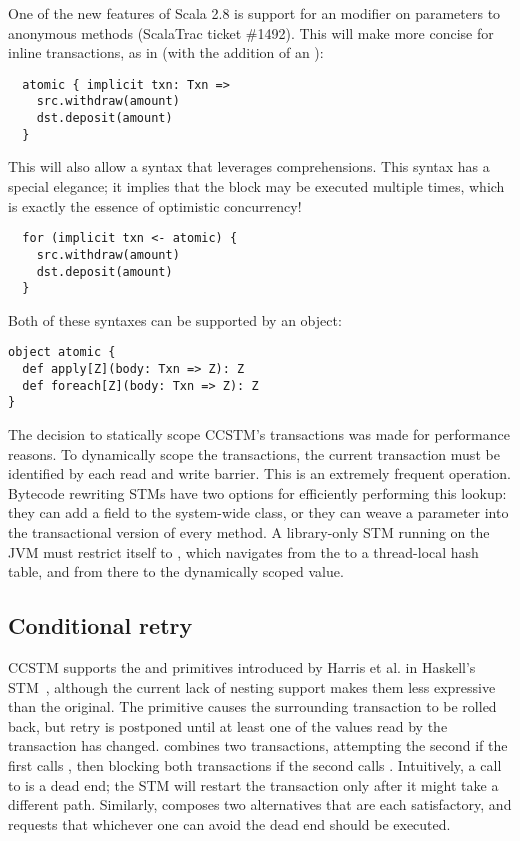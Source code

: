 One of the new features of Scala 2.8 is support for an 
modifier on parameters to anonymous methods (ScalaTrac ticket \#1492).
This will make  more concise for inline
transactions, as in (with the addition of an ):
\lstset{numbers=none}
\begin{lstlisting}
  atomic { implicit txn: Txn =>
    src.withdraw(amount)
    dst.deposit(amount)
  }
\end{lstlisting}
\lstset{numbers=left}
This will also allow a syntax that leverages  comprehensions.
This syntax has a special elegance; it implies that the block may be
executed multiple times, which is exactly the essence of optimistic
concurrency!
\lstset{numbers=none}
\begin{lstlisting}
  for (implicit txn <- atomic) {
    src.withdraw(amount)
    dst.deposit(amount)
  }
\end{lstlisting}
\lstset{numbers=left}
Both of these syntaxes can be supported by an  object:
\lstset{numbers=none}
\begin{lstlisting}
object atomic {
  def apply[Z](body: Txn => Z): Z
  def foreach[Z](body: Txn => Z): Z
}
\end{lstlisting}
\lstset{numbers=left}

The decision to statically scope CCSTM's transactions was made for
performance reasons.  To dynamically scope the transactions, the
current transaction must be identified by each read and write barrier.
This is an extremely frequent operation.  Bytecode rewriting STMs have
two options for efficiently performing this lookup: they can add a field
to the system-wide  class, or they can weave a 
parameter into the transactional version of every method.  A library-only
STM running on the JVM must restrict itself to ,
which navigates from the  to a thread-local hash table,
and from there to the dynamically scoped value.

\subsection{Conditional retry}

CCSTM supports the  and  primitives introduced by
Harris et al. in Haskell's STM~\cite{harris05ctm}, although the current
lack of nesting support makes them less expressive than the original.
The  primitive causes the surrounding transaction to be rolled
back, but retry is postponed until at least one of the values read by
the transaction has changed.   combines two transactions,
attempting the second if the first calls , then blocking
both transactions if the second calls .  Intuitively, a call
to  is a dead end; the STM will restart the transaction
only after it might take a different path.  Similarly, 
composes two alternatives that are each satisfactory, and requests that
whichever one can avoid the dead end should be executed.

